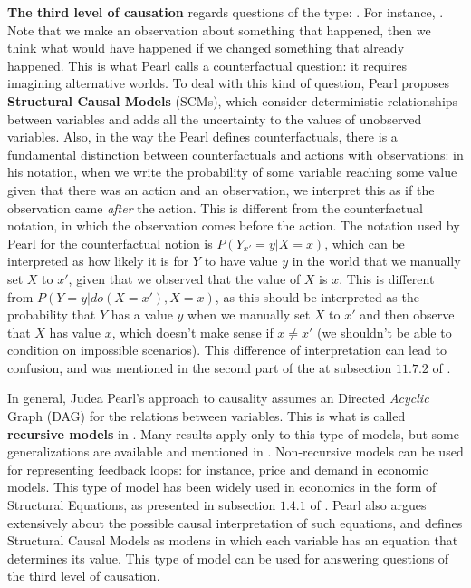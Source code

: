 \textbf{The third level of causation} regards questions of the type: . For instance, . Note that we make an observation about something that happened, then we think what would have happened if we changed something that already happened. This is what Pearl calls a counterfactual question: it requires imagining alternative worlds. To deal with this kind of question, Pearl proposes \textbf{Structural Causal Models} (SCMs), which consider deterministic relationships between variables and adds all the uncertainty to the values of unobserved variables. Also, in the way the Pearl defines counterfactuals, there is a fundamental distinction between counterfactuals and actions with observations: in his notation, when we write the probability of some variable reaching some value given that there was an action and an observation, we interpret this as if the observation came \textit{after} the action. This is different from the counterfactual notation, in which the observation comes before the action. The notation used by Pearl for the counterfactual notion is $P(Y_{x'} = y| X=x)$, which can be interpreted as how likely it is for $Y$ to have value $y$ in the world that we manually set $X$ to $x'$, given that we observed that the value of $X$ is $x$. This is different from $P(Y=y|do(X=x'),X=x)$, as this should be interpreted as the probability that $Y$ has a value $y$ when we manually set $X$ to $x'$ and then observe that $X$ has value $x$, which doesn't make sense if $x \neq x'$ (we shouldn't be able to condition on impossible scenarios). This difference of interpretation can lead to confusion, and was mentioned in the second part of the  at subsection $11.7.2$ of \cite{Causality}.

In general, Judea Pearl's approach to causality assumes an Directed \textit{Acyclic} Graph (DAG) for the relations between variables. This is what is called \textbf{recursive models} in \cite{Causality}. Many results apply only to this type of models, but some generalizations are available and mentioned in \cite{Causality}. Non-recursive models can be used for representing feedback loops: for instance, price and demand in economic models. This type of model has been widely used in economics in the form of Structural Equations, as presented in subsection $1.4.1$ of \cite{Causality}. Pearl also argues extensively about the possible causal interpretation of such equations, and defines Structural Causal Models as modens in which each variable has an equation that determines its value. This type of model can be used for answering questions of the third level of causation.

